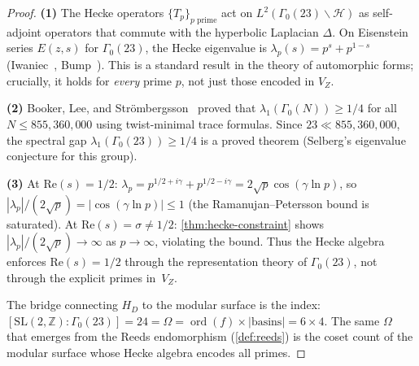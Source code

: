 \documentclass[11pt,a4paper]{article}
\theoremstyle{plain}
\theoremstyle{remark}
\renewcommand{\Omega}{\varOmega}
\newcommand{\Z}{\mathbb{Z}}
\newcommand{\HH}{\mathcal{H}}
\newcommand{\ord}{\operatorname{ord}}
\begin{document}
\begin{proof}
\textbf{(1)}\enspace
The Hecke operators $\{T_p\}_{p\text{ prime}}$ act on
$L^2(\Gamma_0(23)\backslash\HH)$ as self-adjoint operators that commute
with the hyperbolic Laplacian $\Delta$.  On Eisenstein series
$E(z,s)$ for $\Gamma_0(23)$, the Hecke eigenvalue is
$\lambda_p(s) = p^s + p^{1-s}$ (Iwaniec~\cite{iwaniec2002},
Bump~\cite{bump1997}).  This is a standard result in the theory of
automorphic forms; crucially, it holds for \emph{every} prime $p$,
not just those encoded in $V_Z$.

\textbf{(2)}\enspace
Booker, Lee, and Str\"ombergsson~\cite{booker-lee-strombergsson2020}
proved that $\lambda_1(\Gamma_0(N)) \geq 1/4$ for all
$N \leq 855{,}360{,}000$ using twist-minimal trace formulas.
Since $23 \ll 855{,}360{,}000$, the spectral gap
$\lambda_1(\Gamma_0(23)) \geq 1/4$ is a proved theorem
(Selberg's eigenvalue conjecture for this group).

\textbf{(3)}\enspace
At $\mathrm{Re}(s) = 1/2$:
$\lambda_p = p^{1/2+i\gamma} + p^{1/2-i\gamma} = 2\sqrt{p}\cos(\gamma\ln p)$,
so $|\lambda_p|/(2\sqrt{p}) = |\cos(\gamma\ln p)| \leq 1$
(the Ramanujan--Petersson bound is saturated).
At $\mathrm{Re}(s) = \sigma \neq 1/2$: \cref{thm:hecke-constraint}
shows $|\lambda_p|/(2\sqrt{p}) \to \infty$ as $p\to\infty$, violating
the bound.  Thus the Hecke algebra enforces $\mathrm{Re}(s)=1/2$
through the representation theory of $\Gamma_0(23)$, not through
the explicit primes in~$V_Z$.

The bridge connecting $H_D$ to the modular surface is the index:
$[\mathrm{SL}(2,\Z):\Gamma_0(23)] = 24 = \Omega = \ord(f)\times|\text{basins}| = 6\times 4$.
The same $\Omega$ that emerges from the Reeds endomorphism
(\cref{def:reeds}) is the coset count of the modular surface whose
Hecke algebra encodes all primes.
\end{proof}
\end{document}
